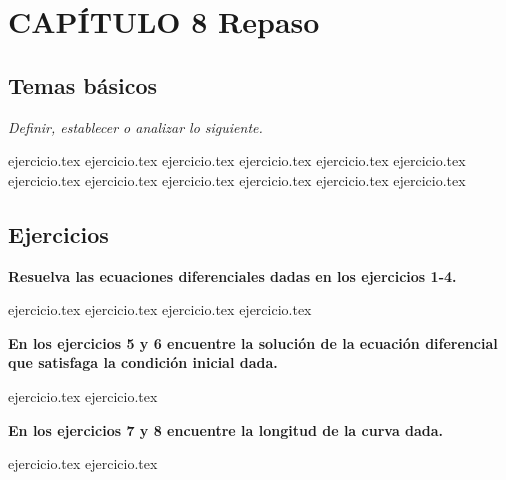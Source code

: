 
\section*{CAPÍTULO 8 \quad Repaso}

\subsection*{Temas básicos}
\noindent \textit{Definir, establecer o analizar lo siguiente.}
\begin{enumerate}
    {ejercicio.tex}
{ejercicio.tex}
{ejercicio.tex}
{ejercicio.tex}
{ejercicio.tex}
{ejercicio.tex}
{ejercicio.tex}
{ejercicio.tex}
{ejercicio.tex}
{ejercicio.tex}
{ejercicio.tex}
{ejercicio.tex}
\end{enumerate}

\subsection*{Ejercicios}

\noindent\textbf{Resuelva las ecuaciones diferenciales dadas en los ejercicios 1-4.}
\begin{enumerate}
    {ejercicio.tex}
{ejercicio.tex}
{ejercicio.tex}
{ejercicio.tex}
\end{enumerate}

\vspace{0.5cm}
\noindent\textbf{En los ejercicios 5 y 6 encuentre la solución de la ecuación diferencial que satisfaga la condición inicial dada.}
\begin{enumerate}
    \setcounter{enumi}{4}
    {ejercicio.tex}
{ejercicio.tex}
\end{enumerate}

\vspace{0.5cm}
\noindent\textbf{En los ejercicios 7 y 8 encuentre la longitud de la curva dada.}
\begin{enumerate}
    \setcounter{enumi}{6}
    {ejercicio.tex}
{ejercicio.tex}
\end{enumerate}

